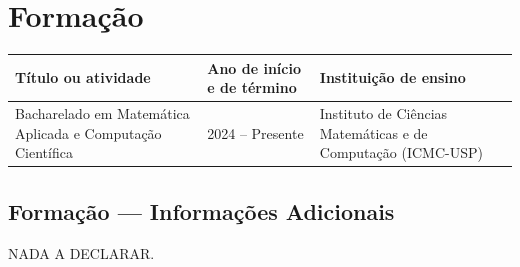 \section{Formação}
	\begin{table}[H]
		\centering
		\begin{tabular}{p{5.7cm} l p{5.1cm}}
			\toprule[1.25pt]
			\textbf{Título ou atividade} & \textbf{Ano de início e de término} & \textbf{Instituição de ensino} \\
			\midrule[0.75pt]
			Bacharelado em Matemática Aplicada e Computação Científica
			& 2024 -- Presente
			& Instituto de Ciências Matemáticas e de Computação (ICMC-USP) \\
			\bottomrule[1.25pt]
		\end{tabular}
	\end{table}

	\subsection{Formação --- Informações Adicionais}
		NADA A DECLARAR.
